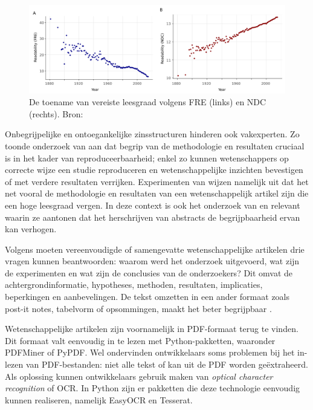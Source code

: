 \begin{figure}[H]
	\includegraphics[width=\linewidth]{img/fre-ndc.png}
	\caption{De toename van vereiste leesgraad volgens FRE (links) en NDC (rechts). Bron: \autocite{PlavenSigray2017}}
	\label{img:fre-ndc}
\end{figure}

Onbegrijpelijke en ontoegankelijke zinsstructuren hinderen ook vakexperten. Zo toonde onderzoek van \textcite{McNutt2014} aan dat begrip van de methodologie en resultaten cruciaal is in het kader van reproduceerbaarheid; enkel zo kunnen wetenschappers op correcte wijze een studie reproduceren en wetenschappelijke inzichten bevestigen of met verdere resultaten verrijken. Experimenten van \textcite{Hubbard2017} wijzen namelijk uit dat het net vooral de methodologie en resultaten van een wetenschappelijk artikel zijn die een hoge leesgraad vergen. In deze context is ook het onderzoek van \textcite{Hartley1999} en \textcite{Snow2010} relevant waarin ze aantonen dat het herschrijven van abstracts de begrijpbaarheid ervan kan verhogen.

\medspace

Volgens \textcite{Hollenkamp2020, McCombes2022} moeten vereenvoudigde of samengevatte wetenschappelijke artikelen drie vragen kunnen beantwoorden: waarom werd het onderzoek uitgevoerd, wat zijn de experimenten en wat zijn de conclusies van de onderzoekers? Dit omvat de achtergrondinformatie, hypotheses, methoden, resultaten, implicaties, beperkingen en aanbevelingen. De tekst omzetten in een ander formaat zoals post-it notes, tabelvorm of opsommingen, maakt het beter begrijpbaar \autocite{Rijkhoff2022}. 

\medspace

Wetenschappelijke artikelen zijn voornamelijk in PDF-formaat terug te vinden. Dit formaat valt eenvoudig in te lezen met Python-pakketten, waaronder PDFMiner of PyPDF. Wel ondervinden ontwikkelaars soms problemen bij het in- lezen van PDF-bestanden: niet alle tekst of kan uit de PDF worden geëxtraheerd. Als oplossing kunnen ontwikkelaars gebruik maken van \textit{optical character recognition} of OCR. In Python zijn er pakketten die deze technologie eenvoudig kunnen realiseren, namelijk EasyOCR en Tesserat.

